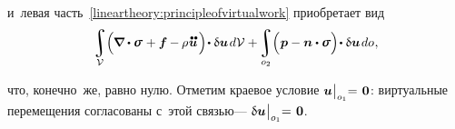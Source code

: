 \begin{otherlanguage}{russian}
\vspace{-0.2em} \noindent и~левая часть~\eqref{lineartheory:principleofvirtualwork} приобретает вид
\[
\integral\displaylimits_{\mathcal{V}} \hspace{-0.5ex} \left(^{\mathstrut} \hspace{-0.2ex} \boldnabla \dotp \linearstress \hspace{.12ex} + \bm{f} \hspace{-0.1ex} - \hspace{-0.1ex} \rho \hspace{.1ex} \mathdotdotabove{\bm{u}} \hspace{0.25ex} \right) \hspace{-0.32ex} \dotp \variation{\bm{u}} \hspace{0.25ex} d\mathcal{V} + \hspace{-0.2ex}
\integral\displaylimits_{o_2} \hspace{-0.5ex} \left(^{\mathstrut} \bm{p} - \bm{n} \dotp \linearstress \right) \hspace{-0.32ex} \dotp \variation{\bm{u}} \hspace{.25ex} do
\hspace{.1ex} ,
\]

\vspace{-0.4em} \noindent что, конечно~же, равно нулю.
Отметим краевое условие ${\bm{u} \hspace{.1ex} \bigr|_{o_1} \hspace{-0.64ex} = \hspace{.2ex} \bm{0}}$: виртуальные перемещения согласованы с~этой связью\:--- ${\updelta\hspace{-0.1ex}\bm{u} \hspace{.1ex} \bigr|_{o_1} \hspace{-0.64ex} = \hspace{.2ex} \bm{0}}$.

\end{otherlanguage}



\label{para:uniquenessfordynamicproblem}

